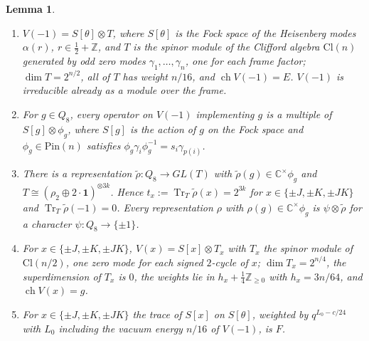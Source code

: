 \documentclass[11pt]{amsart}
\newtheorem{lemma}[theorem]{Lemma}
\theoremstyle{definition}
\newcommand{\Z}{\mathbb{Z}}
\newcommand{\C}{\mathbb{C}}
\newcommand{\ch}{\operatorname{ch}}
\newcommand{\Tr}{\operatorname{Tr}}
\begin{document}
\begin{lemma}\label{lem:minus}
\begin{enumerate}
\item $V(-1)=S[\theta]\otimes T$, where $S[\theta]$ is the Fock space of the Heisenberg modes $\alpha(r)$,
  $r\in\frac12+\Z$, and $T$ is the spinor module of the Clifford algebra $\mathrm{Cl}(n)$ generated by odd
  zero modes $\gamma_1,\dots,\gamma_n$, one for each frame factor; $\dim T=2^{n/2}$, all of $T$ has weight
  $n/16$, and $\ch V(-1)=E$. $V(-1)$ is irreducible already as a module over the frame.
\item For $g\in Q_8$, every operator on $V(-1)$ implementing $g$ is a multiple of $S[g]\otimes\phi_g$,
  where $S[g]$ is the action of $g$ on the Fock space and $\phi_g\in\mathrm{Pin}(n)$ satisfies
  $\phi_g\gamma_i\phi_g^{-1}=s_i\gamma_{p(i)}$.
\item There is a representation $\tilde\rho\colon Q_8\to GL(T)$ with $\tilde\rho(g)\in\C^\times\phi_g$ and
  $T\cong(\rho_2\oplus2\cdot\mathbf 1)^{\otimes3k}$. Hence $t_x:=\Tr_T\tilde\rho(x)=2^{3k}$ for
  $x\in\{\pm J,\pm K,\pm JK\}$ and $\Tr_T\tilde\rho(-1)=0$. Every representation $\rho$ with
  $\rho(g)\in\C^\times\phi_g$ is $\psi\otimes\tilde\rho$ for a character $\psi\colon Q_8\to\{\pm1\}$.
\item For $x\in\{\pm J,\pm K,\pm JK\}$, $V(x)=S[x]\otimes T_x$ with $T_x$ the spinor module of
  $\mathrm{Cl}(n/2)$, one zero mode for each signed $2$-cycle of $x$; $\dim T_x=2^{n/4}$, the
  superdimension of $T_x$ is $0$, the weights lie in $h_x+\frac14\Z_{\ge0}$ with $h_x=3n/64$, and
  $\ch V(x)=g$.
\item For $x\in\{\pm J,\pm K,\pm JK\}$ the trace of $S[x]$ on $S[\theta]$, weighted by
  $q^{L_0-c/24}$ with $L_0$ including the vacuum energy $n/16$ of $V(-1)$, is $F$.
\end{enumerate}
\end{lemma}
\end{document}
